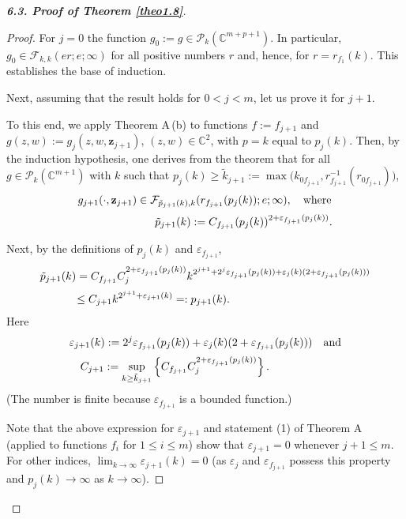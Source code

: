 \documentclass[11pt, oneside]{amsart}
\begin{document}
\begin{proof}[{\bf 6.3. Proof of Theorem \ref{theo1.8}}]
\begin{proof}
For $j=0$ the function $g_0:=g\in \mathcal P_k(\mathbb C^{m+p+1})$. In particular, $g_0\in\mathcal F_{k,k}(er;e;\infty)$ for all positive numbers $r$ and, hence, for $r=r_{f_1}(k)$. This establishes the base of induction.

Next, assuming that the result holds for $0<j<m$, let us prove it for $j+1$. 

To this end, we apply Theorem A\,(b) to functions $f:=f_{j+1}$ and $g(z,w):=g_j(z,w,\mathbf z_{j+1})$, $(z,w)\in\mathbb C^2$, with $p=k$ equal to $p_j(k)$. Then, by the induction hypothesis, one derives from the theorem that for all $g\in \mathcal P_k(\mathbb C^{m+1})$ with $k$ such that $p_j(k)\ge \tilde k_{j+1}:=\max\bigl(k_{0f_{j+1}}, r_{f_{j+1}}^{-1}(r_{0f_{j+1}})\bigr )$,\smallskip
\begin{equation}\label{equat6.44}
\begin{array}{l}
g_{j+1}(\cdot,\mathbf z_{j+1})\in\mathcal F_{\tilde p_{j+1}(k),k}(r_{f_{j+1}}(p_j(k));e;\infty),\quad {\rm where}\medskip\\
\displaystyle\quad\qquad\qquad\qquad \tilde p_{j+1}(k):=C_{f_{j+1}}(p_{j}(k))^{2+\varepsilon_{f_{j+1}}(p_j(k))}.
 \end{array}
 \end{equation}

Next, by the definitions of $p_{j}(k)$ and $\varepsilon_{f_{j+1}}$,
\[
\begin{array}{l}
\displaystyle \tilde p_{j+1}(k)=C_{f_{j+1}} C_j^{2+\varepsilon_{f_{j+1}}(p_j(k))} k^{2^{j+1}+2^j \varepsilon_{f_{j+1}}(p_j(k))+\varepsilon_j(k) (2+\varepsilon_{f_{j+1}}(p_j(k)))}\medskip\\
\displaystyle
\quad\qquad\ \le C_{j+1} k^{2^{j+1}+\varepsilon_{j+1}(k)}=:p_{j+1}(k).\quad\qquad\
\end{array}
\]
Here 
\[
\begin{array}{l}
\displaystyle
\varepsilon_{j+1}(k):=2^j \varepsilon_{f_{j+1}}(p_j(k))+\varepsilon_j(k) (2+\varepsilon_{f_{j+1}}(p_j(k)))\quad {\rm and}\medskip\\
\displaystyle
\quad C_{j+1}:=\sup_{k\ge\tilde k_{j+1}}\left\{C_{f_{j+1}} C_j^{2+\varepsilon_{f_{j+1}}(p_j(k))}\right\}.
\end{array}
\]
(The number is finite because $\varepsilon_{f_{j+1}}$ is a bounded function.)

Note that the above expression for $\varepsilon_{j+1}$ and statement (1) of Theorem A (applied to functions $f_i$ for $1\le i\le m$) show that $\varepsilon_{j+1}= 0$ whenever $j+1\le m$.  For other indices, $\lim_{k\rightarrow\infty}\varepsilon_{j+1}(k)=0$ (as $\varepsilon_j$ and $\varepsilon_{f_{j+1}}$ possess this property and $p_j(k)\rightarrow\infty$ as $k\rightarrow\infty$).


\end{proof}
\end{proof}
\end{document}
